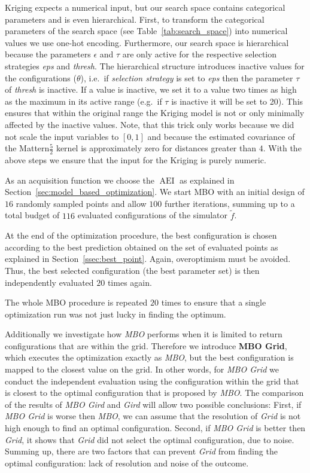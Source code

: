 \documentclass[bimj,fleqn]{w-art}
\theoremstyle{plain}
\theoremstyle{definition}
\begin{document}
Kriging expects a numerical input, but our search space contains categorical parameters and is even hierarchical.
First, to transform the categorical parameters of the search space (see Table~\ref{tab:search_space}) into numerical values we use one-hot encoding.
Furthermore, our search space is hierarchical because the parameters $\epsilon$ and $\tau$ are only active for the respective selection strategies \emph{eps} and \emph{thresh}.
The hierarchical structure introduces inactive values for the configurations ($\theta$), i.e.\ if \emph{selection strategy} is set to \emph{eps} then the parameter $\tau$ of \emph{thresh} is inactive.
If a value is inactive, we set it to a value two times as high as the maximum in its active range (e.g.\ if $\tau$ is inactive it will be set to 20).
This ensures that within the original range the Kriging model is not or only minimally affected by the inactive values.
Note, that this trick only works because we did not scale the input variables to $[0,1]$ and because the estimated covariance of the Mattern$\frac{5}{2}$ kernel is approximately zero for distances greater than $4$.
With the above steps we ensure that the input for the Kriging is purely numeric.

As an acquisition function we choose the $\operatorname{AEI}$ as explained in Section~\ref{sec:model_based_optimization}.
We start MBO with an initial design of $16$ randomly sampled points and allow $100$ further iterations, summing up to a total budget of $116$ evaluated configurations of the simulator $\tilde{f}$.

At the end of the optimization procedure, the best configuration is chosen according to the best prediction obtained on the set of evaluated points as explained in Section~\ref{ssec:best_point}.
Again, overoptimism must be avoided. 
Thus, the best selected configuration (the best parameter set) is then independently evaluated $20$ times again.

The whole MBO procedure is repeated $20$ times to ensure that a single optimization run was not just lucky in finding the optimum.

Additionally we investigate how \emph{MBO} performs when it is limited to return configurations that are within the grid.
Therefore we introduce \textbf{MBO Grid}, which executes the optimization exactly as \emph{MBO}, but the best configuration is mapped to the closest value on the grid. 
In other words, for \emph{MBO Grid} we conduct the independent evaluation using the configuration within the grid that is closest to the optimal configuration that is proposed by \emph{MBO}.
The comparison of the results of \emph{MBO Gird} and \emph{Gird} will allow two possible conclusions:
First, if \emph{MBO Grid} is worse then \emph{MBO}, we can assume that the resolution of \emph{Grid} is not high enough to find an optimal configuration.
Second, if \emph{MBO Grid} is better then \emph{Grid}, it shows that \emph{Grid} did not select the optimal configuration, due to noise.
Summing up, there are two factors that can prevent \emph{Grid} from finding the optimal configuration: lack of resolution and noise of the outcome.
\end{document}
